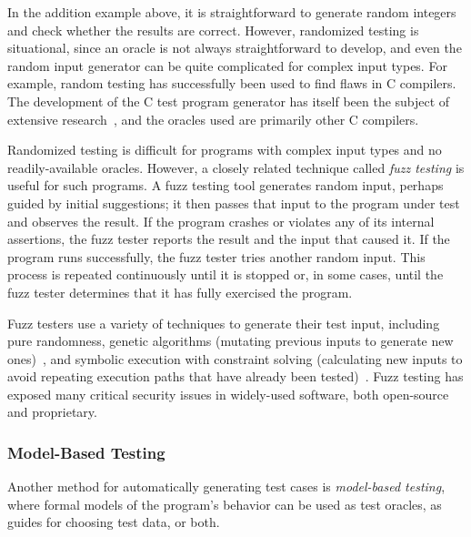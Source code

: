 In the addition example above, it is straightforward to generate
random integers and check whether the results are correct. However,
randomized testing is situational, since an oracle is not always
straightforward to develop, and even the random input generator can be
quite complicated for complex input types. For example, random testing
has successfully been used to find flaws in C compilers. The
development of the C test program generator has itself been the
subject of extensive research~\cite{yang2011finding}, and the oracles
used are primarily other C compilers.

Randomized testing is difficult for programs with complex input types
and no readily-available oracles. However, a closely related technique
called \emph{fuzz testing} is useful for such programs. A fuzz testing
tool generates random input, perhaps guided by initial suggestions; it
then passes that input to the program under test and observes the
result. If the program crashes or violates any of its internal
assertions, the fuzz tester reports the result and the input that
caused it. If the program runs successfully, the fuzz tester tries
another random input. This process is repeated continuously until it
is stopped or, in some cases, until the fuzz tester determines that it
has fully exercised the program.

Fuzz testers use a variety of techniques to generate their test input,
including pure randomness, genetic algorithms (mutating previous
inputs to generate new ones)~\cite{DeMott07}, and symbolic execution
with constraint solving (calculating new inputs to avoid repeating
execution paths that have already been
tested)~\cite{Godefroid08}. Fuzz testing has exposed many critical
security issues in widely-used software, both open-source and
proprietary.

\subsubsection{Model-Based Testing}

Another method for automatically generating test cases is
\emph{model-based testing}, where formal models of the program's
behavior can be used as test oracles, as guides for choosing test
data, or both.


